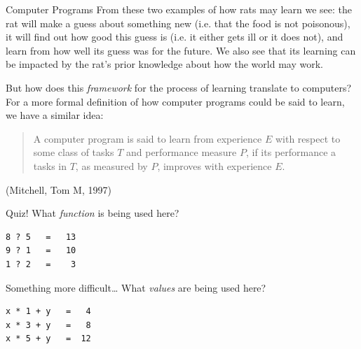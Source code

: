 \documentclass[10pt]{beamer}
\begin{document}
\begin{frame}[label={sec:orgd5ed126}]{Computer Programs}
From these two examples of how rats may learn we see: the rat will make a guess about
something new (i.e. that the food is not poisonous), it will find out how good this
guess is (i.e. it either gets ill or it does not), and learn from how well its guess
was for the future. We also see that its learning can be impacted by the rat's prior
knowledge about how the world may work.

But how does this \emph{framework} for the process of learning translate to computers? For a
more formal definition of how computer programs could be said to learn, we have a
similar idea:

\begin{quote}
A computer program is said to learn from experience \(E\) with respect
to some class of tasks \(T\) and performance measure \(P\), if its performance
a tasks in \(T\), as measured by \(P\), improves with experience \(E\).
\end{quote}

(Mitchell, Tom M, 1997)
\end{frame}

\begin{frame}[label={sec:orga3066b9},fragile]{Quiz!}
 What \emph{function} is being used here?

\begin{verbatim}
8 ? 5   =   13
9 ? 1   =   10
1 ? 2   =    3
\end{verbatim}
\end{frame}

\begin{frame}[label={sec:orga53b68d},fragile]{Something more difficult\ldots{}}
 What \emph{values} are being used here?

\begin{verbatim}
x * 1 + y   =   4
x * 3 + y   =   8
x * 5 + y   =  12
\end{verbatim}
\end{frame}
\end{document}
